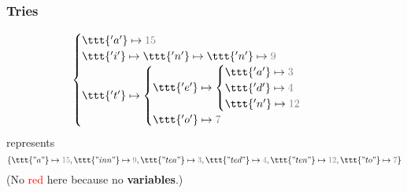 \begin{frame}
\frametitle{Tries}
\[
\begin{cases}
   \ttt{'a'} \mapsto \textcolor{gray}{15} \\
   \ttt{'i'} \mapsto \ttt{'n'} \mapsto \ttt{'n'} \mapsto \textcolor{gray}{9} \\
   \ttt{'t'} \mapsto
   \begin{cases}
      \ttt{'e'} \mapsto
      \begin{cases}
          \ttt{'a'} \mapsto \textcolor{gray}{3} \\
          \ttt{'d'} \mapsto \textcolor{gray}{4} \\
          \ttt{'n'} \mapsto \textcolor{gray}{12}
      \end{cases} \\
      \ttt{'o'} \mapsto \textcolor{gray}{7}
   \end{cases}
\end{cases}
\]
represents
\[\{
\ttt{"a"} \mapsto \textcolor{gray}{15},
\ttt{"inn"} \mapsto \textcolor{gray}{9},
\ttt{"tea"} \mapsto \textcolor{gray}{3},
\ttt{"ted"} \mapsto \textcolor{gray}{4},
\ttt{"ten"} \mapsto \textcolor{gray}{12},
\ttt{"to"} \mapsto \textcolor{gray}{7}
\}\]
(No \textcolor{red}{red} here because no \textbf{variables}.)
\end{frame}
